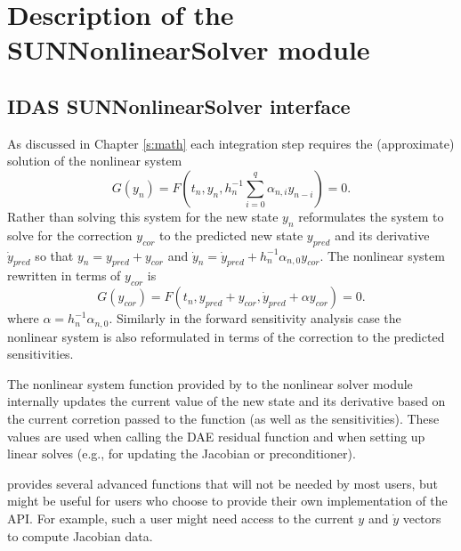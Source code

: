 \chapter{Description of the SUNNonlinearSolver module}\label{c:sunnonlinsol}


\section{IDAS SUNNonlinearSolver interface}
\label{s:sunnonlinsol_interface}

As discussed in Chapter \ref{s:math} each integration step requires the
(approximate) solution of the nonlinear system
\begin{equation}
  G(y_n) = F\left(t_n, y_n, h_{n}^{-1}\sum_{i=0}^{q}\alpha_{n,i}y_{n-i}\right) = 0.
\end{equation}
Rather than solving this system for the new state $y_n$ {\idas} reformulates the
system to solve for the correction $y_{cor}$ to the predicted new state $y_{pred}$
and its derivative $\dot{y}_{pred}$ so that $y_n = y_{pred} + y_{cor}$ and
$\dot{y}_n = \dot{y}_{pred} + h_{n}^{-1} \alpha_{n,0} y_{cor}$. The nonlinear
system rewritten in terms of $y_{cor}$ is
\begin{equation} \label{eq:res_corrector}
  G(y_{cor}) = F\left(t_n, y_{pred}+y_{cor},
  \dot{y}_{pred} + \alpha y_{cor}\right) = 0.
\end{equation}
where $\alpha = h_{n}^{-1} \alpha_{n,0}$.
Similarly in the forward sensitivity analysis case the nonlinear system is also
reformulated in terms of the correction to the predicted sensitivities.

The nonlinear system function provided by {\idas} to the nonlinear solver module
internally updates the current value of the new state and its derivative based
on the current corretion passed to the function (as well as the sensitivities).
These values are used when calling the DAE residual function and when setting up
linear solves (e.g., for updating the Jacobian or preconditioner).

{\idas} provides several advanced functions that will not be needed by most users,
but might be useful for users who choose to provide their own implementation of
the  API. For example, such a user might need access to
the current $y$ and $\dot{y}$ vectors to compute Jacobian data.

